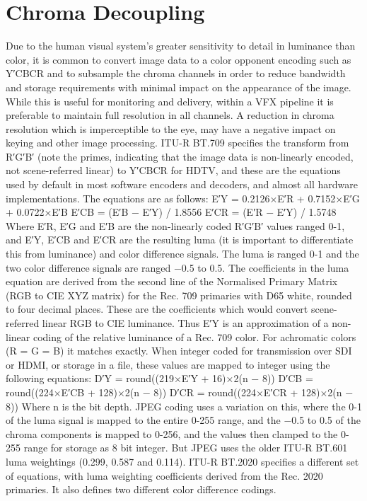 \section{Chroma Decoupling}

Due to the human visual system’s greater sensitivity to detail in luminance than color, it is common to convert image data to a color opponent encoding such as Y′CBCR and to subsample the chroma channels in order to reduce bandwidth and storage requirements with minimal impact on the appearance of the image. While this is useful for monitoring and delivery, within a VFX pipeline it is preferable to maintain full resolution in all channels. A reduction in chroma resolution which is imperceptible to the eye, may have a negative impact on keying and other image processing.
ITU-R BT.709 specifies the transform from R′G′B′ (note the primes, indicating that the image data is non-linearly encoded, not scene-referred linear) to Y′CBCR for HDTV, and these are the equations used by default in most software encoders and decoders, and almost all hardware implementations. The equations are as follows:
	E′Y = 0.2126×E′R + 0.7152×E′G + 0.0722×E′B
	E′CB =  (E′B − E′Y) / 1.8556
	E′CR =  (E′R − E′Y) / 1.5748
Where E′R, E′G and E′B are the non-linearly coded R′G′B′ values ranged 0-1, and E′Y, E′CB and E′CR are the resulting luma (it is important to differentiate this from luminance) and color difference signals. The luma is ranged 0-1 and the two color difference signals are ranged −0.5 to 0.5.
The coefficients in the luma equation are derived from the second line of the Normalised Primary Matrix (RGB to CIE XYZ matrix) for the Rec. 709 primaries with D65 white, rounded to four decimal places. These are the coefficients which would convert scene-referred linear RGB to CIE luminance. Thus E′Y is an approximation of a non-linear coding of the relative luminance of a Rec. 709 color. For achromatic colors (R = G = B) it matches exactly.
When integer coded for transmission over SDI or HDMI, or storage in a file, these values are mapped to integer using the following equations:
	D′Y = round((219×E′Y + 16)×2(n − 8))
	D′CB = round((224×E′CB + 128)×2(n − 8))
	D′CR = round((224×E′CR + 128)×2(n − 8))
Where n is the bit depth.
JPEG coding uses a variation on this, where the 0-1 of the luma signal is mapped to the entire 0-255 range, and the −0.5 to 0.5 of the chroma components is mapped to 0-256, and the values then clamped to the 0-255 range for storage as 8 bit integer. But JPEG uses the older ITU-R BT.601 luma weightings (0.299, 0.587 and 0.114).
ITU-R BT.2020 specifies a different set of equations, with luma weighting coefficients derived from the Rec. 2020 primaries. It also defines two different color difference codings.
